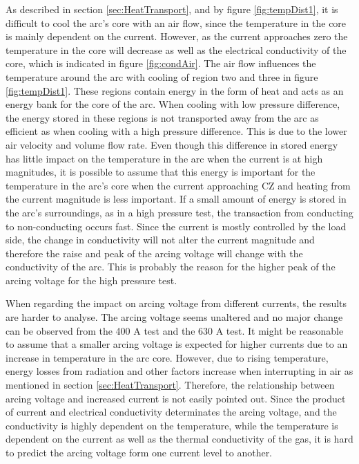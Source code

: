 \documentclass[10pt,a4paper,twoside]{article}
\begin{document}
As described in section \ref{sec:HeatTransport}, and by figure \ref{fig:tempDist1}, it is difficult to cool the arc's core with an air flow, since the temperature in the core is mainly dependent on the current. However, as the current approaches zero the temperature in the core will decrease as well as the electrical conductivity of the core, which is indicated in figure \ref{fig:condAir}. The air flow influences the temperature around the arc with cooling of region two and three in figure \ref{fig:tempDist1}. These regions contain energy in the form of heat and acts as an energy bank for the core of the arc. When cooling with low pressure difference, the energy stored in these regions is not transported away from the arc as efficient as when cooling with a high pressure difference. This is due to the lower air velocity and volume flow rate. Even though this difference in stored energy has little impact on the temperature in the arc when the current is at high magnitudes, it is possible to assume that this energy is important for the temperature in the arc's core when the current approaching CZ and heating from the current magnitude is less important. If a small amount of energy is stored in the arc's surroundings, as in a high pressure test, the transaction from conducting to non-conducting occurs fast. Since the current is mostly controlled by the load side, the change in conductivity will not alter the current magnitude and therefore the raise and peak of the arcing voltage will change with the conductivity of the arc. This is probably the reason for the higher peak of the arcing voltage for the high pressure test.

When regarding the impact on arcing voltage from different currents, the results are harder to analyse. The arcing voltage seems unaltered and no major change can be observed from the 400 A test and the 630 A test. It might be reasonable to assume that a smaller arcing voltage is expected for higher currents due to an increase in temperature in the arc core. However, due to rising temperature, energy losses from radiation and other factors increase when interrupting in air as mentioned in section \ref{sec:HeatTransport}. Therefore, the relationship between arcing voltage and increased current is not easily pointed out. Since the product of current and electrical conductivity determinates the arcing voltage, and the conductivity is highly dependent on the temperature, while the temperature is dependent on the current as well as the thermal conductivity of the gas, it is hard to predict the arcing voltage form one current level to another.
\end{document}
